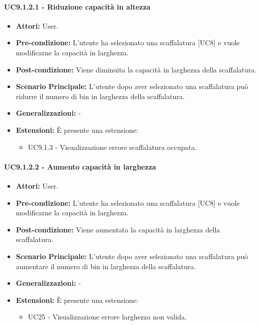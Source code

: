 \paragraph{UC9.1.2.1 - Riduzione capacità in altezza}
\begin{itemize}
    \item \textbf{Attori:} User.
    \item \textbf{Pre-condizione:} L'utente ha selezionato una scaffalatura [UC8] e vuole modificarne la capacità in larghezza.
    \item \textbf{Post-condizione:} Viene diminuita la capacità in larghezza della scaffalatura.
    \item \textbf{Scenario Principale:} L'utente dopo aver selezionato una scaffalatura può ridurre il numero di bin in larghezza della scaffalatura.
    \item \textbf{Generalizzazioni:} -
    \item \textbf{Estensioni:} È presente una estensione:
    \begin{itemize}
        \item UC9.1.3 - Visualizzazione errore scaffalatura occupata.
    \end{itemize}
\end{itemize}


\paragraph{UC9.1.2.2 - Aumento capacità in larghezza}
\begin{itemize}
    \item \textbf{Attori:} User.
    \item \textbf{Pre-condizione:} L'utente ha selezionato una scaffalatura [UC8] e vuole modificarne la capacità in larghezza.
    \item \textbf{Post-condizione:} Viene aumentata la capacità in larghezza della scaffalatura.
    \item \textbf{Scenario Principale:} L'utente dopo aver selezionato una scaffalatura può aumentare il numero di bin in larghezza della scaffalatura.
    \item \textbf{Generalizzazioni:} -
    \item \textbf{Estensioni:} È presente una estensione:
    \begin{itemize}
        \item UC25 - Visualizzazione errore larghezza non valida.
    \end{itemize}
\end{itemize}


